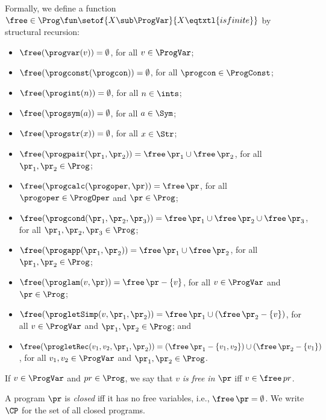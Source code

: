 Formally, we define a function $\free\in\Prog\fun
\setof{X\sub\ProgVar}{X\eqtxtl{is finite}}$ by structural recursion:
\begin{itemize}
\item $\free(\progvar(v)) = \emptyset$, for all $v\in\ProgVar$;

\item $\free(\progconst(\progcon)) = \emptyset$, for all
  $\progcon\in\ProgConst$;

\item $\free(\progint(n)) = \emptyset$, for all $n\in\ints$;

\item $\free(\progsym(a)) = \emptyset$, for all $a\in\Sym$;

\item $\free(\progstr(x)) = \emptyset$, for all $x\in\Str$;

\item $\free(\progpair(\pr_1,\pr_2)) = \free\,\pr_1\cup\free\,\pr_2$,
  for all $\pr_1,\pr_2\in\Prog$;

\item $\free(\progcalc(\progoper,\pr)) = \free\,\pr$,
  for all $\progoper\in\ProgOper$ and $\pr\in\Prog$;

\item $\free(\progcond(\pr_1,\pr_2,\pr_3)) =
\free\,\pr_1\cup\free\,\pr_2\cup\free\,\pr_3$,
  for all $\pr_1,\pr_2,\pr_3\in\Prog$;

\item $\free(\progapp(\pr_1,\pr_2)) = \free\,\pr_1\cup\free\,\pr_2$,
  for all $\pr_1,\pr_2\in\Prog$;

\item $\free(\proglam(v,\pr)) = \free\,\pr - \{v\}$,
  for all $v\in\ProgVar$ and $\pr\in\Prog$;

\item $\free(\progletSimp(v,\pr_1,\pr_2)) =
  \free\,\pr_1\cup(\free\,\pr_2 - \{v\})$,
  for all $v\in\ProgVar$ and $\pr_1,\pr_2\in\Prog$; and

\item $\free(\progletRec(v_1,v_2,\pr_1,\pr_2)) =
  (\free\,\pr_1 - \{v_1,v_2\})\cup (\free\,\pr_2 - \{v_1\})$,
  for all $v_1,v_2\in\ProgVar$ and $\pr_1,\pr_2\in\Prog$.
\end{itemize}
If $v\in\ProgVar$ and $pr\in\Prog$, we say that $v$ \emph{is free in}
$\pr$ iff $v\in\free\,pr$.

A program $\pr$ is \emph{closed} iff it has no free variables, i.e.,
$\free\,\pr = \emptyset$.  We write $\CP$ for the set of all closed
programs.

